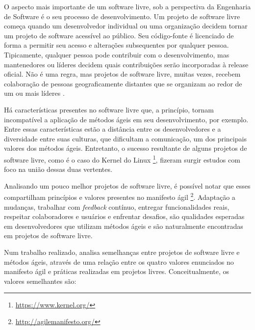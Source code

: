 O aspecto mais importante de um software livre, sob a perspectiva da Engenharia de Software é o seu processo de desenvolvimento. Um projeto de software livre começa quando um desenvolvedor individual ou uma organização decidem tornar um projeto de software acessível ao público. Seu código-fonte é licenciado de forma a permitir seu acesso e alterações subsequentes por qualquer pessoa. Tipicamente, qualquer pessoa pode contribuir com o desenvolvimento, mas mantenedores ou líderes decidem quais contribuições serão incorporadas à release oficial. Não é uma regra, mas projetos de software livre, muitas vezes, recebem colaboração de pessoas geograficamente distantes que se organizam ao redor de um ou mais líderes \cite{corbucci2011freemethods}. 

Há características presentes no software livre que, a princípio, tornam incompatível a aplicação de métodos ágeis em seu desenvolvimento, por exemplo. Entre essas características estão a distância entre os desenvolvedores e a diversidade entre suas culturas, que dificultam a comunicação, um dos principais valores dos métodos ágeis. Entretanto, o sucesso resultante de alguns projetos de software livre, como é o caso do Kernel do Linux \footnote{\url{https://www.kernel.org/}}, fizeram surgir estudos com foco na união dessas duas vertentes.

Analisando um pouco melhor projetos de software livre, é possível notar que esses compartilham princípios e valores presentes no manifesto ágil \footnote{\url{http://agilemanifesto.org/}}. Adaptação a mudanças, trabalhar com \textit{feedback} contínuo, entregar funcionalidades reais, respeitar colaboradores e usuários e enfrentar desafios, são qualidades esperadas em desenvolvedores que utilizam métodos ágeis e são naturalmente encontradas em projetos de software livre.

Num trabalho realizado,  analisa semelhanças entre projetos de software livre e métodos ágeis, através de uma relação entre os quatro valores enunciados no manifesto ágil e práticas realizadas em projetos livres. 
%
%
Conceitualmente, os valores semelhantes são:

